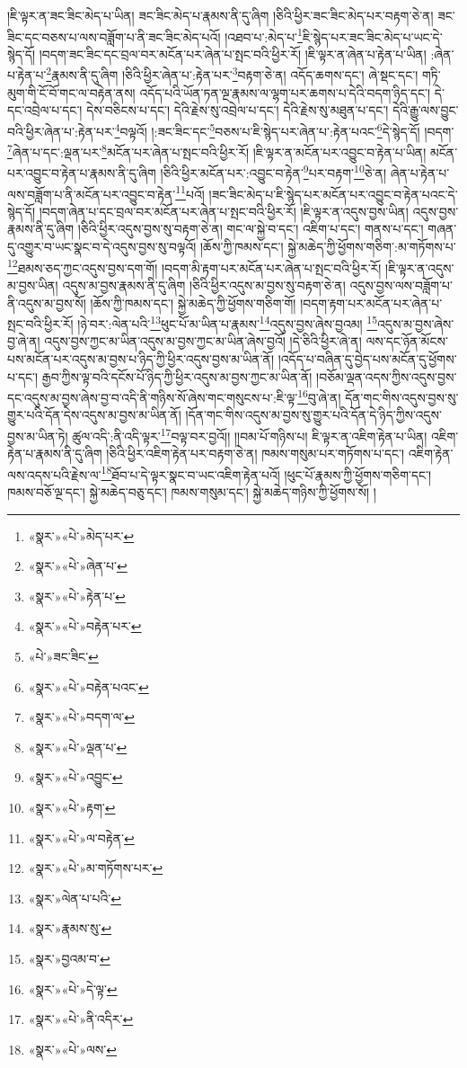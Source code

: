 །ཇི་ལྟར་ན་ཟང་ཟིང་མེད་པ་ཡིན། ཟང་ཟིང་མེད་པ་རྣམས་ནི་དུ་ཞིག །ཅིའི་ཕྱིར་ཟང་ཟིང་མེད་པར་བརྟག་ཅེ་ན། ཟང་ཟིང་དང་བཅས་པ་ལས་བཟློག་པ་ནི་ཟང་ཟིང་མེད་པའོ། །འཐབ་པ་:མེད་པ་\footnote{«སྣར་»«པེ་»མེད་པར་}ཇི་སྙེད་པར་ཟང་ཟིང་མེད་པ་ཡང་དེ་སྙེད་དོ། །བདག་ཟང་ཟིང་དང་བྲལ་བར་མངོན་པར་ཞེན་པ་སྤང་བའི་ཕྱིར་རོ། །ཇི་ལྟར་ན་ཞེན་པ་རྟེན་པ་ཡིན། :ཞེན་པ་རྟེན་པ་\footnote{«སྣར་»«པེ་»ཞེན་པ་}རྣམས་ནི་དུ་ཞིག །ཅིའི་ཕྱིར་ཞེན་པ་:རྟེན་པར་\footnote{«སྣར་»«པེ་»རྟེན་པ་}བརྟག་ཅེ་ན། འདོད་ཆགས་དང་། ཞེ་སྡང་དང་། གཏི་མུག་གི་ངོ་བོ་གང་ལ་བརྟེན་ནས། འདོད་པའི་ཡོན་ཏན་ལྔ་རྣམས་ལ་ལྷག་པར་ཆགས་པ་དེའི་བདག་ཉིད་དང་། དེ་དང་འབྲེལ་པ་དང་། དེས་བཅིངས་པ་དང་། དེའི་རྗེས་སུ་འབྲེལ་པ་དང་། དེའི་རྗེས་སུ་མཐུན་པ་དང་། དེའི་རྒྱུ་ལས་བྱུང་བའི་ཕྱིར་ཞེན་པ་:རྟེན་པར་\footnote{«སྣར་»«པེ་»བརྟེན་པར་}བལྟའོ། །:ཟང་ཟིང་དང་\footnote{«པེ་»ཟང་ཟིང་}བཅས་པ་ཇི་སྙེད་པར་ཞེན་པ་:རྟེན་པའང་\footnote{«སྣར་»«པེ་»བརྟེན་པའང་}དེ་སྙེད་དོ། །བདག་\footnote{«སྣར་»«པེ་»བདག་ལ་}ཞེན་པ་དང་:ལྡན་པར་\footnote{«སྣར་»«པེ་»ལྡན་པ་}མངོན་པར་ཞེན་པ་སྤང་བའི་ཕྱིར་རོ། །ཇི་ལྟར་ན་མངོན་པར་འབྱུང་བ་རྟེན་པ་ཡིན། མངོན་པར་འབྱུང་བ་རྟེན་པ་རྣམས་ནི་དུ་ཞིག །ཅིའི་ཕྱིར་མངོན་པར་:འབྱུང་བ་རྟེན་\footnote{«སྣར་»«པེ་»འབྱུང་}པར་བརྟག་\footnote{«སྣར་»«པེ་»རྟག་}ཅེ་ན། ཞེན་པ་རྟེན་པ་ལས་བཟློག་པ་ནི་མངོན་པར་འབྱུང་བ་རྟེན་\footnote{«སྣར་»«པེ་»ལ་བརྟེན་}པའོ། །ཟང་ཟིང་མེད་པ་ཇི་སྙེད་པར་མངོན་པར་འབྱུང་བ་རྟེན་པའང་དེ་སྙེད་དོ། །བདག་ཞེན་པ་དང་བྲལ་བར་མངོན་པར་ཞེན་པ་སྤང་བའི་ཕྱིར་རོ། །ཇི་ལྟར་ན་འདུས་བྱས་ཡིན། འདུས་བྱས་རྣམས་ནི་དུ་ཞིག །ཅིའི་ཕྱིར་འདུས་བྱས་སུ་བརྟག་ཅེ་ན། གང་ལ་སྐྱེ་བ་དང་། འཇིག་པ་དང་། གནས་པ་དང་། གཞན་དུ་འགྱུར་བ་ཡང་སྣང་བ་དེ་འདུས་བྱས་སུ་བལྟའོ། །ཆོས་ཀྱི་ཁམས་དང་། སྐྱེ་མཆེད་ཀྱི་ཕྱོགས་གཅིག་:མ་གཏོགས་པ་\footnote{«སྣར་»«པེ་»མ་གཏོགས་པར་}ཐམས་ཅད་ཀྱང་འདུས་བྱས་དག་གོ། །བདག་མི་རྟག་པར་མངོན་པར་ཞེན་པ་སྤང་བའི་ཕྱིར་རོ། །ཇི་ལྟར་ན་འདུས་མ་བྱས་ཡིན། འདུས་མ་བྱས་རྣམས་ནི་དུ་ཞིག །ཅིའི་ཕྱིར་འདུས་མ་བྱས་སུ་བརྟག་ཅེ་ན། འདུས་བྱས་ལས་བཟློག་པ་ནི་འདུས་མ་བྱས་སོ། །ཆོས་ཀྱི་ཁམས་དང་། སྐྱེ་མཆེད་ཀྱི་ཕྱོགས་གཅིག་གོ། །བདག་རྟག་པར་མངོན་པར་ཞེན་པ་སྤང་བའི་ཕྱིར་རོ། །ཉེ་བར་:ལེན་པའི་\footnote{«སྣར་»ལེན་པ་པའི་}ཕུང་པོ་མ་ཡིན་པ་རྣམས་\footnote{«སྣར་»རྣམས་སུ་}འདུས་བྱས་ཞེས་བྱའམ། \footnote{«སྣར་»བྱའམ་བ་}འདུས་མ་བྱས་ཞེས་བྱ་ཞེ་ན། འདུས་བྱས་ཀྱང་མ་ཡིན་འདུས་མ་བྱས་ཀྱང་མ་ཡིན་ཞེས་བྱའོ། །དེ་ཅིའི་ཕྱིར་ཞེ་ན། ལས་དང་ཉོན་མོངས་པས་མངོན་པར་འདུས་མ་བྱས་པ་ཉིད་ཀྱི་ཕྱིར་འདུས་བྱས་མ་ཡིན་ནོ། །འདོད་པ་བཞིན་དུ་བྱེད་པས་མངོན་དུ་ཕྱོགས་པ་དང་། རྒྱབ་ཀྱིས་ལྟ་བའི་དངོས་པོ་ཉིད་ཀྱི་ཕྱིར་འདུས་མ་བྱས་ཀྱང་མ་ཡིན་ནོ། །བཅོམ་ལྡན་འདས་ཀྱིས་འདུས་བྱས་དང་འདུས་མ་བྱས་ཞེས་བྱ་བ་འདི་ནི་གཉིས་སོ་ཞེས་གང་གསུངས་པ་:ཇི་ལྟ་\footnote{«སྣར་»«པེ་»དེ་ལྟ་}བུ་ཞེ་ན། དོན་གང་གིས་འདུས་བྱས་སུ་གྱུར་པའི་དོན་དེས་འདུས་མ་བྱས་མ་ཡིན་ནོ། །དོན་གང་གིས་འདུས་མ་བྱས་སུ་གྱུར་པའི་དོན་དེ་ཉིད་ཀྱིས་འདུས་བྱས་མ་ཡིན་ཏེ། ཚུལ་འདི་:ནི་འདི་ལྟར་\footnote{«སྣར་»«པེ་»ནི་འདིར་}བལྟ་བར་བྱའོ།། །།བམ་པོ་གཉིས་པ། ཇི་ལྟར་ན་འཇིག་རྟེན་པ་ཡིན། འཇིག་རྟེན་པ་རྣམས་ནི་དུ་ཞིག །ཅིའི་ཕྱིར་འཇིག་རྟེན་པར་བརྟག་ཅེ་ན། ཁམས་གསུམ་པར་གཏོགས་པ་དང་། འཇིག་རྟེན་ལས་འདས་པའི་རྗེས་ལ་\footnote{«སྣར་»«པེ་»ལས་}ཐོབ་པ་དེ་ལྟར་སྣང་བ་ཡང་འཇིག་རྟེན་པའོ། །ཕུང་པོ་རྣམས་ཀྱི་ཕྱོགས་གཅིག་དང་། ཁམས་བཅོ་ལྔ་དང་། སྐྱེ་མཆེད་བཅུ་དང་། ཁམས་གསུམ་དང་། སྐྱེ་མཆེད་གཉིས་ཀྱི་ཕྱོགས་སོ། །
